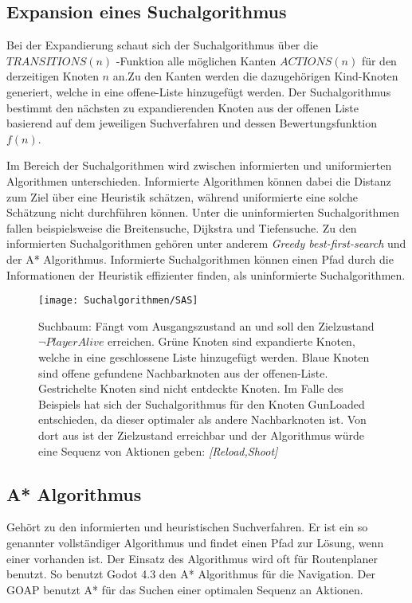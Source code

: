 \subsection{Expansion eines Suchalgorithmus}

Bei der Expandierung schaut sich der Suchalgorithmus über die $TRANSITIONS(n)$ -Funktion alle möglichen Kanten $ACTIONS(n)$ für den derzeitigen Knoten $n$ an.Zu den Kanten werden die dazugehörigen Kind-Knoten generiert, welche in eine offene-Liste hinzugefügt werden. Der Suchalgorithmus bestimmt den nächsten zu expandierenden Knoten aus der offenen Liste basierend auf dem jeweiligen Suchverfahren und dessen Bewertungsfunktion $f(n)$.

Im Bereich der Suchalgorithmen wird zwischen informierten und uniformierten Algorithmen unterschieden. Informierte Algorithmen können dabei die Distanz zum Ziel über eine Heuristik schätzen, während uniformierte eine solche Schätzung nicht durchführen können. Unter die uninformierten Suchalgorithmen fallen beispielsweise die Breitensuche, Dijkstra und Tiefensuche. Zu den informierten Suchalgorithmen gehören unter anderem \textit{Greedy best-first-search} und der A* Algorithmus. Informierte Suchalgorithmen können einen Pfad durch die Informationen der Heuristik effizienter finden, als uninformierte Suchalgorithmen.

\begin{figure}[h]
  \centering
  \texttt{[image: Suchalgorithmen/SAS]}
	\captionsetup{justification=justified, format=plain}
  \caption{Suchbaum: Fängt vom Ausgangszustand an und soll den Zielzustand $\lnot \textit{PlayerAlive}$ erreichen. Grüne Knoten sind expandierte Knoten, welche in eine geschlossene Liste hinzugefügt werden. Blaue Knoten sind offene gefundene Nachbarknoten aus der offenen-Liste. Gestrichelte Knoten sind nicht entdeckte Knoten. Im Falle des Beispiels hat sich der Suchalgorithmus für den Knoten GunLoaded entschieden, da dieser optimaler als andere Nachbarknoten ist. Von dort aus ist der Zielzustand erreichbar und der Algorithmus würde eine Sequenz von Aktionen geben: \textit{[Reload,Shoot]}}
  \label{Suchalgorithmen}
\end{figure}
\clearpage

\subsection{A* Algorithmus}

Gehört zu den informierten und heuristischen Suchverfahren. Er ist ein so genannter vollständiger Algorithmus und findet einen Pfad zur Lösung, wenn einer vorhanden ist. Der Einsatz des Algorithmus wird oft für Routenplaner benutzt. So benutzt Godot 4.3 den A* Algorithmus für die Navigation. Der GOAP benutzt A* für das Suchen einer optimalen Sequenz an Aktionen.

